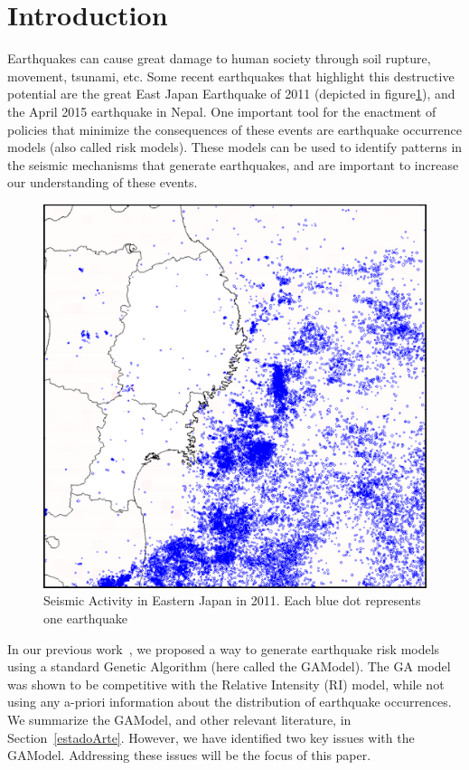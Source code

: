 \section{Introduction}\label{intro}

Earthquakes can cause great damage to human society through soil
rupture, movement, tsunami, etc. Some recent earthquakes that
highlight this destructive potential are the great East Japan
Earthquake of 2011 (depicted in figure\ref{GreatEastJapan}), and the
April 2015 earthquake in Nepal. One important tool for the enactment
of policies that minimize the consequences of these events are
earthquake occurrence models (also called risk models). These models
can be used to identify patterns in the seismic mechanisms that
generate earthquakes, and are important to increase our understanding
of these events.


\begin{figure}[]
\centering
\includegraphics[width=.45\textwidth]{img/earthquakes2011.png}
\caption{Seismic Activity in Eastern Japan in 2011. Each blue dot
  represents one earthquake}
\label{GreatEastJapan}
\end{figure}


In our previous work~\cite{ecta14}, we proposed a way to generate
earthquake risk models using a standard Genetic Algorithm (here called
the GAModel). The GA model was shown to be competitive with the
Relative Intensity (RI) model, while not using any a-priori
information about the distribution of earthquake occurrences. We
summarize the GAModel, and other relevant literature, in
Section~\ref{estadoArte}. However, we have identified two key issues
with the GAModel. Addressing these issues will be the focus of this
paper.


